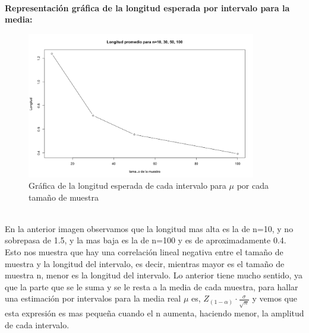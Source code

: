 \documentclass[letterpaper,12pt,onecolumn,titlepage]{article}
\begin{document}
~\\ \textbf{Representaci\'{o}n gr\'{a}fica de la longitud esperada por intervalo para la media:}
~\\ \begin{figure}[!h]
    \begin{center}
        \includegraphics[width=10cm]{Figuras/Pa2.png}
        \caption{Gr\'{a}fica de la longitud esperada de cada intervalo para $\mu$ por cada tama\~{n}o de muestra}
        \label{fig:Densidad}
    \end{center}
\end{figure}
~\\ En la anterior imagen observamos que la longitud mas alta es la de n=10, y no sobrepasa de 1.5, y la mas baja es la de n=100 y es de aproximadamente 0.4. Esto nos muestra que hay una correlaci\'{o}n lineal negativa entre el tama\~{n}o de muestra y la longitud del intervalo, es decir, mientras mayor es el tama\~{n}o de muestra n, menor es la longitud del intervalo. Lo anterior tiene mucho sentido, ya que la parte que se le suma y se le resta a la media de cada muestra, para hallar una estimaci\'{o}n por intervalos para la media real $\mu$ es, $Z_{(1-\alpha)}\cdot\frac{\sigma}{\sqrt{n}}$ y vemos que esta expresi\'{o}n es mas peque\~{n}a cuando el n aumenta, haciendo menor, la amplitud de cada intervalo.
\end{document}
